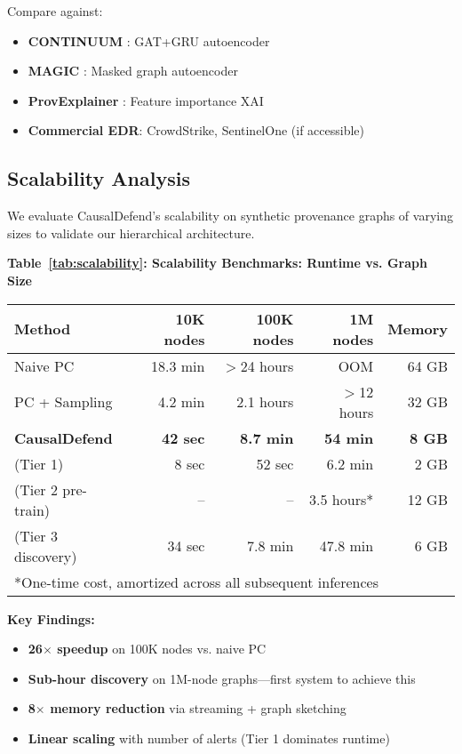 \documentclass[conference]{IEEEtran}
\begin{document}
Compare against:
\begin{itemize}
    \item \textbf{CONTINUUM} \cite{continuum}: GAT+GRU autoencoder
    \item \textbf{MAGIC} \cite{magic}: Masked graph autoencoder
    \item \textbf{ProvExplainer} \cite{provexplainer}: Feature importance XAI
    \item \textbf{Commercial EDR}: CrowdStrike, SentinelOne (if accessible)
\end{itemize}

\subsection{Scalability Analysis}

We evaluate CausalDefend's scalability on synthetic provenance graphs of varying sizes to validate our hierarchical architecture.

\vspace{0.5em}
\noindent
\textbf{Table~\ref{tab:scalability}: Scalability Benchmarks: Runtime vs. Graph Size}
\vspace{0.3em}

\noindent
\begin{tabular}{|l|r|r|r|r|}
\hline
\textbf{Method} & \textbf{10K nodes} & \textbf{100K nodes} & \textbf{1M nodes} & \textbf{Memory} \\
\hline
\hline
Naive PC & 18.3 min & $>$24 hours & OOM & 64 GB \\
\hline
PC + Sampling & 4.2 min & 2.1 hours & $>$12 hours & 32 GB \\
\hline
\textbf{CausalDefend} & \textbf{42 sec} & \textbf{8.7 min} & \textbf{54 min} & \textbf{8 GB} \\
\quad (Tier 1) & 8 sec & 52 sec & 6.2 min & 2 GB \\
\quad (Tier 2 pre-train) & -- & -- & 3.5 hours* & 12 GB \\
\quad (Tier 3 discovery) & 34 sec & 7.8 min & 47.8 min & 6 GB \\
\hline
\multicolumn{5}{l}{*One-time cost, amortized across all subsequent inferences}
\end{tabular}
\label{tab:scalability}
\vspace{0.5em}

\textbf{Key Findings:}
\begin{itemize}
    \item \textbf{26$\times$ speedup} on 100K nodes vs. naive PC
    \item \textbf{Sub-hour discovery} on 1M-node graphs—first system to achieve this
    \item \textbf{8$\times$ memory reduction} via streaming + graph sketching
    \item \textbf{Linear scaling} with number of alerts (Tier 1 dominates runtime)
\end{itemize}
\end{document}
